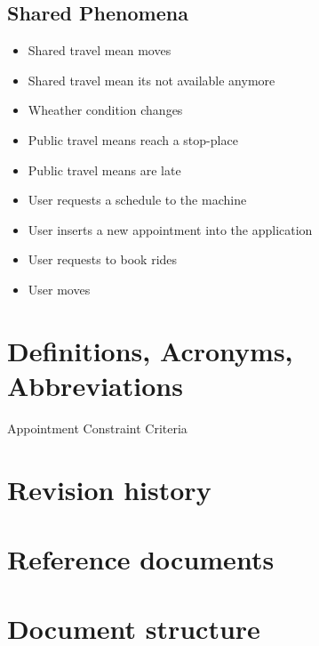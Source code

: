 \subsection{Shared Phenomena}
\begin{itemize}
\item Shared travel mean moves
\item Shared travel mean its not available anymore
\item Wheather condition changes
\item Public travel means reach a stop-place
\item Public travel means are late 
\item User requests a schedule to the machine
\item User inserts a new appointment into the application
\item User requests to book rides
\item User moves
\end{itemize}

\section{Definitions, Acronyms, Abbreviations}

Appointment
Constraint
Criteria

\section{Revision history}

\section{Reference documents}

\section{Document structure}